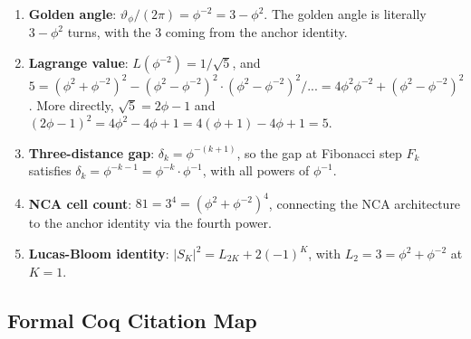 \begin{enumerate}
  \item \textbf{Golden angle}: $\vartheta_\phi / (2\pi) = \phi^{-2} = 3 - \phi^2$.
        The golden angle is literally $3 - \phi^2$ turns, with the 3
        coming from the anchor identity.
  \item \textbf{Lagrange value}: $L(\phi^{-2}) = 1/\sqrt{5}$, and
        $5 = (\phi^2+\phi^{-2})^2 - (\phi^2-\phi^{-2})^2 \cdot (\phi^2-\phi^{-2})^2/...
        = 4\phi^2\phi^{-2}+(\phi^2-\phi^{-2})^2$.  More directly,
        $\sqrt{5} = 2\phi-1$ and $(2\phi-1)^2 = 4\phi^2 - 4\phi + 1 = 4(\phi+1) - 4\phi + 1 = 5$.
  \item \textbf{Three-distance gap}: $\delta_k = \phi^{-(k+1)}$, so
        the gap at Fibonacci step $F_k$ satisfies
        $\delta_k = \phi^{-k-1} = \phi^{-k}\cdot\phi^{-1}$, with all
        powers of $\phi^{-1}$.
  \item \textbf{NCA cell count}: $81 = 3^4 = (\phi^2+\phi^{-2})^4$,
        connecting the NCA architecture to the anchor identity via the
        fourth power.
  \item \textbf{Lucas-Bloom identity}: $|S_K|^2 = L_{2K} + 2(-1)^K$,
        with $L_2 = 3 = \phi^2 + \phi^{-2}$ at $K=1$.
\end{enumerate}

\subsection{Formal Coq Citation Map}
\label{subsec:coq-map}

\begin{table}[H]
\centering
\caption{Coq theorem map for Chapter~10 (L10)}
\label{tab:coq-map}
\end{table}


